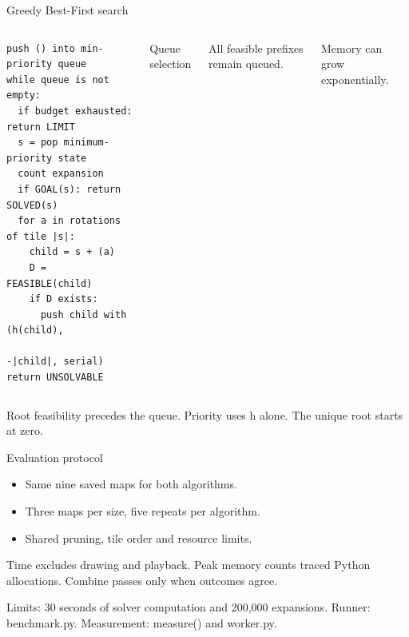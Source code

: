 \documentclass[aspectratio=169,11pt]{beamer}
\newcommand{\src}[1]{\vfill{\tiny\color{muted}#1}}
\begin{document}
\begin{frame}[fragile]{Greedy Best-First search}
\begin{columns}[T,onlytextwidth]
\begin{lstlisting}
push () into min-priority queue
while queue is not empty:
  if budget exhausted: return LIMIT
  s = pop minimum-priority state
  count expansion
  if GOAL(s): return SOLVED(s)
  for a in rotations of tile |s|:
    child = s + (a)
    D = FEASIBLE(child)
    if D exists:
      push child with (h(child),
                       -|child|, serial)
return UNSOLVABLE
\end{lstlisting}
\small Queue selection\par\vspace{3mm}
\par\vspace{3mm}
All feasible prefixes remain queued.\par\vspace{3mm}
Memory can grow exponentially.
\end{columns}
\src{Root feasibility precedes the queue. Priority uses h alone. The unique root starts at zero.}
\end{frame}

\begin{frame}{Evaluation protocol}
\begin{itemize}
\item Same nine saved maps for both algorithms.
\item Three maps per size, five repeats per algorithm.
\item Shared pruning, tile order and resource limits.
\end{itemize}
\vspace{4mm}
\vspace{4mm}\par
\small Time excludes drawing and playback. Peak memory counts traced Python
allocations. Combine passes only when outcomes agree.\par\vspace{3mm}
Limits: 30 seconds of solver computation and 200,000 expansions.
\src{Runner: benchmark.py. Measurement: measure() and worker.py.}
\end{frame}
\end{document}
